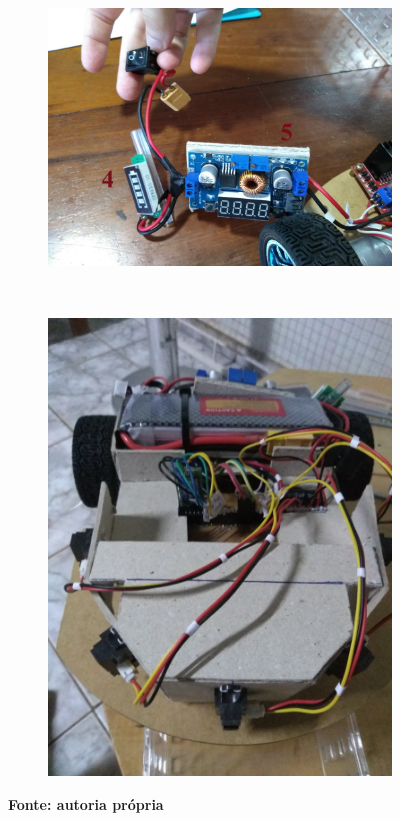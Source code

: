 \begin{figure}[!ht]
	~
	\begin{subfigure}[b]{0.49\textwidth}%
		\centering
		\includegraphics[trim= 0cm 0cm 0cm 0cm,clip,
scale=0.055]{Figuras/RoboMontagem3}
	\end{subfigure}
	~
	\begin{subfigure}[b]{0.49\textwidth}%
		\centering
		\includegraphics[trim={0cm 0cm 0cm 0cm},clip,
scale=0.055]{Figuras/RoboMontagem4}
	\end{subfigure}
	
	\textbf{Fonte: autoria própria}
\end{figure}